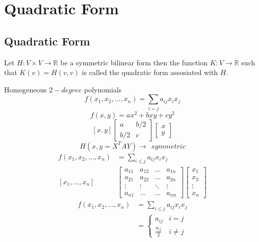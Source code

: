 \chapter{Quadratic Form}

\section{Quadratic Form}
\begin{definition}
Let $H:V\times V \to \mathbb{R}$ be a symmetric bilinear form then the function $K:V\to \mathbb{R}$ such that $K(v)=H(v,v)$ is called the quadratic form assosiated with $H$.
\end{definition}

\begin{example}
Homogeneous $2-degree$ polynomials 
$$f(x_1,x_2,\dots,x_n)=\sum_{i=j}a_{ij}x_ix_j$$
$$f(x,y)=ax^{2}+bxy+cy^{2}$$
$$\left[x,y\right]\left[\begin{array}{cc}
    a &b/2  \\
     b/2& c
\end{array}\right]\left[\begin{array}{c}
     x  \\
     y 
\end{array}\right]$$
$$H(x,y=X^{T}AY)\to~~symmetric$$
\begin{align*}
    f(x_1,x_2,\dots,x_n)&=\sum_{i\leq j} a_{ij} x_i x_j\\
    \left[x_1,\dots,x_n\right]&\left[\begin{array}{cccc}
         a_{11}& a_{12}&\dots&a_{1n} \\
         a_{21}&a_{22}&\dots&a_{2n}\\
         \vdots&\vdots& \ddots& \vdots\\
         a_{n1}&\dots&\dots&a_{nn}
    \end{array}\right] \left[\begin{array}{c}
         x_1  \\
         x_2\\
         \vdots\\
         x_n
    \end{array}\right] 
     \end{align*}
    \begin{align*}
        f(x_1,x_2,\dots,x_n)&=\sum_{i\leq j} a_{ij} x_i x_j\\
        &=\begin{cases}
        a_{ij}& i=j\\
        \frac{a_{ij}}{2}& i\neq j
        \end{cases}
   \end{align*}
\end{example}
